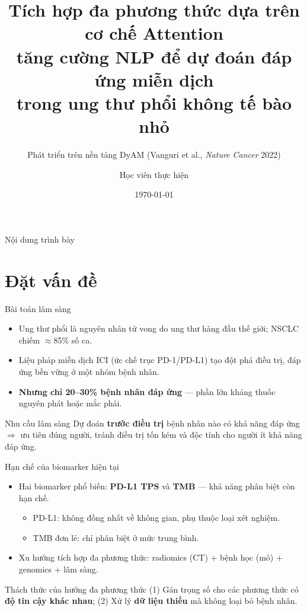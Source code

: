 \documentclass[aspectratio=169,11pt]{beamer}
\title[NLP-Augmented Multimodal Attention]{Tích hợp đa phương thức dựa trên cơ chế Attention\\ tăng cường NLP để dự đoán đáp ứng miễn dịch\\ trong ung thư phổi không tế bào nhỏ}
\subtitle{\small Phát triển trên nền tảng DyAM (Vanguri et al., \textit{Nature Cancer} 2022)}
\author[Học viên]{Học viên thực hiện}
\institute[]{\small Người hướng dẫn: [Tên GVHD] \quad•\quad [Đơn vị]}
\date{\today}
\begin{document}
\begin{frame}[plain]
  \titlepage
\end{frame}

\begin{frame}{Nội dung trình bày}
  \tableofcontents
\end{frame}

\section{Đặt vấn đề}

\begin{frame}{Bài toán lâm sàng}
  \begin{itemize}
    \item Ung thư phổi là nguyên nhân tử vong do ung thư \alert{hàng đầu} thế giới; NSCLC chiếm \alert{$\approx$85\%} số ca.
    \item Liệu pháp miễn dịch ICI (ức chế trục PD-1/PD-L1) tạo \alert{đột phá} điều trị, đáp ứng bền vững ở một nhóm bệnh nhân.
    \item \textbf{Nhưng chỉ 20–30\% bệnh nhân đáp ứng} — phần lớn kháng thuốc nguyên phát hoặc mắc phải.
  \end{itemize}
  \vfill
  \begin{block}{Nhu cầu lâm sàng}
    Dự đoán \textbf{trước điều trị} bệnh nhân nào có khả năng đáp ứng $\Rightarrow$ ưu tiên đúng người, tránh điều trị tốn kém và độc tính cho người ít khả năng đáp ứng.
  \end{block}
\end{frame}

\begin{frame}{Hạn chế của biomarker hiện tại}
  \begin{itemize}
    \item Hai biomarker phổ biến: \textbf{PD-L1 TPS} và \textbf{TMB} — khả năng phân biệt còn hạn chế.
    \begin{itemize}
      \item PD-L1: không đồng nhất về không gian, phụ thuộc loại xét nghiệm.
      \item TMB đơn lẻ: chỉ phân biệt ở mức trung bình.
    \end{itemize}
    \item[$\Rightarrow$] Xu hướng \alert{tích hợp đa phương thức}: radiomics (CT) + bệnh học (mô) + genomics + lâm sàng.
  \end{itemize}
  \vfill
  \begin{block}{Thách thức của hướng đa phương thức}
    (1) Gán trọng số cho các phương thức có \textbf{độ tin cậy khác nhau}; \quad
    (2) Xử lý \textbf{dữ liệu thiếu} mà không loại bỏ bệnh nhân.
  \end{block}
\end{frame}
\end{document}
